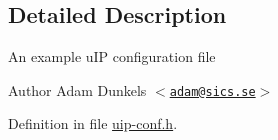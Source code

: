 \subsection{Detailed Description}
An example uIP configuration file \begin{DoxyAuthor}{Author}
Adam Dunkels $<$\href{mailto:adam@sics.se}{\tt adam@sics.se}$>$ 
\end{DoxyAuthor}


Definition in file \hyperlink{uip-conf_8h_source}{uip-\/conf.h}.

